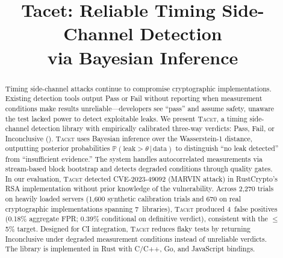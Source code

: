 \documentclass[letterpaper,twocolumn,10pt]{article}
\newcommand{\tacet}{\textsc{Tacet}\xspace}
\newcommand{\prob}[1]{\mathbb{P}(#1)}
\newcommand{\given}{\,|\,}
\begin{document}

\date{}

\title{\Large \bf Tacet: Reliable Timing Side-Channel Detection\\via Bayesian Inference}


\maketitle

\begin{abstract}

Timing side-channel attacks continue to compromise cryptographic implementations.
Existing detection tools output Pass or Fail without reporting when measurement
conditions make results unreliable—developers see ``pass'' and assume safety,
unaware the test lacked power to detect exploitable leaks.
%
We present \tacet, a timing side-channel detection library with empirically calibrated
three-way verdicts: Pass, Fail, or Inconclusive (). \tacet uses
Bayesian inference over the Wasserstein-1 distance, outputting posterior probabilities
$\prob{\text{leak} > \theta \given \text{data}}$ to distinguish ``no leak detected''
from ``insufficient evidence.'' The system handles autocorrelated measurements via
stream-based block bootstrap and detects degraded conditions through quality gates.
%
In our evaluation, \tacet detected CVE-2023-49092 (MARVIN attack) in
RustCrypto's RSA implementation without prior knowledge of the vulnerability. Across 2{,}270 trials on heavily loaded
servers (1{,}600 synthetic calibration trials and 670 on real cryptographic
implementations spanning 7~libraries), \tacet produced 4~false positives (0.18\%
aggregate FPR; 0.39\% conditional on definitive verdict), consistent with the
$\leq$5\% target.
Designed for CI integration, \tacet reduces flaky tests by returning Inconclusive
under degraded measurement conditions instead of unreliable verdicts. The library
is implemented in Rust with C/C++, Go, and JavaScript bindings.

\end{abstract}
\end{document}
